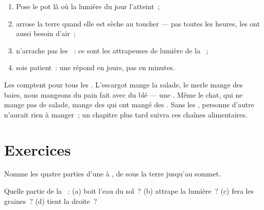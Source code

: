 \begin{method}\label{met:g1:plants-around-us:care}
\begin{enumerate}
  \item Pose le pot là où la lumière du jour l'atteint~;
  \item arrose la terre quand elle est sèche au toucher --- pas
        toutes les heures, les  ont aussi besoin d'air~;
  \item n'arrache pas les ~: ce sont les attrapeuses de
        lumière de la ~;
  \item sois patient~: une  répond en jours, pas en minutes.
\end{enumerate}
\end{method}

\begin{remark}\label{rem:g1:plants-around-us:food}
Les  comptent pour tous les . L'escargot mange la
salade, le merle mange des baies, nous mangeons du pain fait avec du
blé --- une . Même le chat, qui ne mange pas de salade, mange
des  qui ont mangé des . Sans les , personne
d'autre n'aurait rien à manger~; un chapitre plus tard suivra ces
chaînes alimentaires.
\end{remark}

\section{Exercices}

\begin{exercise}[$\star$]\label{exo:g1:plants-around-us:1}
Nomme les quatre parties d'une  à , de sous la terre
jusqu'au sommet.
\end{exercise}

\begin{exercise}[$\star$]\label{exo:g1:plants-around-us:2}
Quelle partie de la ~: (a) boit l'eau du sol~? (b) attrape la
lumière~? (c) fera les graines~? (d) tient la  droite~?
\end{exercise}

